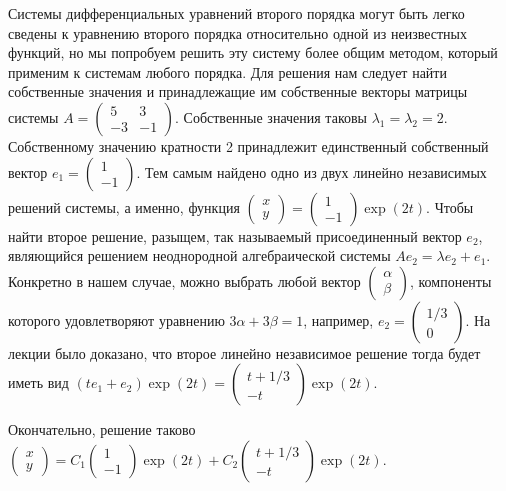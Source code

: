 \begin{solution}
Системы дифференциальных уравнений второго порядка могут быть легко сведены к уравнению второго порядка относительно одной из неизвестных функций, но мы попробуем решить эту систему более общим методом, который применим к системам любого порядка. Для решения нам следует найти собственные значения и принадлежащие им собственные векторы матрицы системы $A=\left(\begin{array}{cc} {5} & {3} \\ {-3} & {-1} \end{array}\right)$. Собственные значения таковы $\lambda _{1} =\lambda _{2} =2$. Собственному значению кратности 2 принадлежит единственный собственный вектор $e_{1} =\left(\begin{array}{c} {1} \\ {-1} \end{array}\right)$. Тем самым найдено одно из двух линейно независимых решений системы, а именно, функция $\left(\begin{array}{c} {x} \\ {y} \end{array}\right)=\left(\begin{array}{c} {1} \\ {-1} \end{array}\right)\exp (2t)$. Чтобы найти второе решение, разыщем, так называемый присоединенный вектор $e_{2} $, являющийся решением неоднородной алгебраической системы $Ae_{2} =\lambda e_{2} +e_{1} $. Конкретно в нашем случае, можно выбрать любой вектор $\left(\begin{array}{c} {\alpha } \\ {\beta } \end{array}\right)$, компоненты которого удовлетворяют уравнению $3\alpha +3\beta =1$, например, $e_{2} =\left(\begin{array}{c} {1/3} \\ {0} \end{array}\right)$. На лекции было доказано, что второе линейно независимое решение тогда будет иметь вид $(te_{1} +e_{2} )\exp (2t)=\left(\begin{array}{c} {t+1/3} \\ {-t} \end{array}\right)\exp (2t)$.

Окончательно, решение таково $\left(\begin{array}{c} {x} \\ {y} \end{array}\right)=C_{1} \left(\begin{array}{c} {1} \\ {-1} \end{array}\right)\exp (2t)+C_{2} \left(\begin{array}{c} {t+1/3} \\ {-t} \end{array}\right)\exp (2t)$.


\end{solution}
